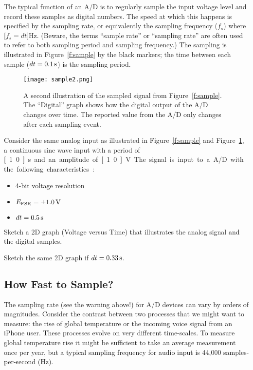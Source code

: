 The typical function of an A/D is to regularly sample the input voltage level and record these samples as digital numbers.  The speed at which this happens is specified by the sampling rate, or equivalently the \gls{sampling frequency} ($f_s$) where \unit[$f_s=dt$]{Hz}. (Beware, the terms ``sample rate'' or ``sampling rate'' are often used to refer to both sampling period and sampling frequency.)  The sampling is illustrated in Figure~\ref{f:sample} by the black markers; the time between each sample ($dt=\unit[0.1]{s}$) is the sampling period.


\begin{figure}[hbt!]
\centering
\texttt{[image: sample2.png]}
\caption{A second illustration of the sampled signal from Figure~\ref{f:sample}. The ``Digital'' graph shows how the digital output of the A/D changes over time.  The reported value from the A/D only changes after each sampling event.}
\label{f:sample2}
\end{figure}

\begin{ex}
Consider the same analog input as illustrated in Figure~\ref{f:sample} and Figure~\ref{f:sample2}, a continuous sine wave input with a period of \unit[1.0]{s} and an amplitude of \unit[1.0]{V}.  The signal is input to a A/D with the following characteristics:
\begin{itemize} 
\item 4-bit voltage resolution
\item $E_{\mathrm{FSR}}= \pm \unit[1.0]{V}$
\item $dt = \unit[0.5]{s}$
\end{itemize}
Sketch a 2D graph (Voltage versus Time) that illustrates the analog signal and the digital samples.

\vspace{1ex}

Sketch the same 2D graph if $dt=\unit[0.33]{s}$.
\end{ex}

\subsection{How Fast to Sample?}
The sampling rate (see the warning above!) for A/D devices can vary by orders of magnitudes. Consider the contrast between two processes that we might want to measure: the rise of global temperature or the incoming voice signal from an iPhone user.  These processes evolve on very different time-scales.  To measure global temperature rise it might be sufficient to take an average measurement once per year, but a typical sampling frequency for audio input is 44,000 samples-per-second (Hz).  

